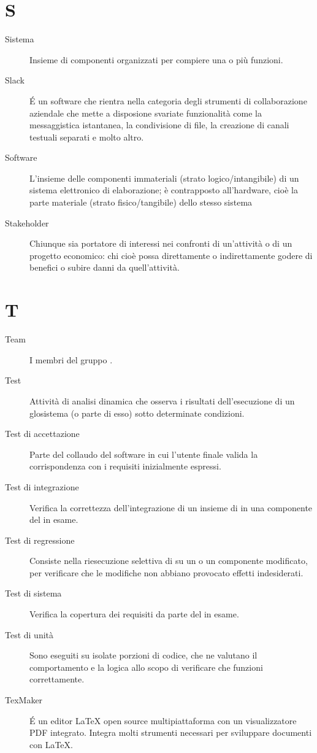 \documentclass[a4paper, oneside]{article}
\begin{document}
\section{S}
\begin{description}
  \item[Sistema] Insieme di componenti organizzati per compiere una o più funzioni.
  \item[Slack] É un software che rientra nella categoria degli strumenti di collaborazione aziendale che mette a disposione svariate funzionalità come la messaggistica istantanea, la condivisione di file, la creazione di canali testuali separati e molto altro.
  \item[Software] L'insieme delle componenti immateriali (strato logico/intangibile) di un sistema elettronico di elaborazione; è contrapposto all'hardware, cioè la parte materiale (strato fisico/tangibile) dello stesso sistema
  \item[Stakeholder] Chiunque sia portatore di interessi nei confronti di un’attività o di un progetto economico: chi cioè possa direttamente o indirettamente godere di benefici o subire danni da quell’attività.
\end{description}
\newpage
\section{T}
\begin{description}
  \item[Team] I membri del gruppo \gruppo{}.
  \item[Test] Attività di analisi dinamica che osserva i risultati dell'esecuzione di un \\glo{sistema} (o parte di esso) sotto determinate condizioni.
  \item[Test di accettazione] Parte del collaudo del software in cui l'utente finale valida la corrispondenza con i requisiti inizialmente espressi.
  \item[Test di integrazione] Verifica la correttezza dell'integrazione di un insieme di  in una componente del  in esame.
  \item[Test di regressione] Consiste nella riesecuzione selettiva di  su un  o un componente modificato, per verificare che le modifiche non abbiano provocato effetti indesiderati.
  \item[Test di sistema] Verifica la copertura dei requisiti da parte del  in esame.
  \item[Test di unità] Sono  eseguiti su isolate porzioni di codice, che ne valutano il comportamento e la logica allo scopo di verificare che funzioni correttamente.
  \item[TexMaker] É un editor LaTeX open source multipiattaforma con un visualizzatore PDF integrato. Integra molti strumenti necessari per sviluppare documenti con LaTeX.
\end{description}
\newpage
\end{document}
